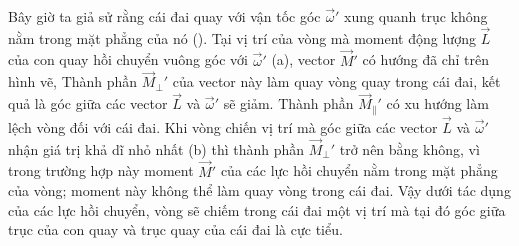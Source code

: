 Bây giờ ta giả sử rằng cái đai quay với vận tốc góc $\vec{\omega}'$ xung quanh trục không nằm trong mặt phẳng của nó (). Tại vị trí của vòng mà moment động lượng $\vec{L}$ của con quay hồi chuyển vuông góc với $\vec{\omega}'$ (a), vector $\vec{M}'$ có hướng đã chỉ trên hình vẽ, Thành phần $\vec{M}_{\perp}'$ của vector này làm quay vòng quay trong cái đai, kết quả là góc giữa các vector $\vec{L}$ và $\vec{\omega}'$ sẽ giảm. Thành phần $\vec{M}_{\parallel}'$ có xu hướng làm lệch vòng đối với cái đai. Khi vòng chiến vị trí mà góc giữa các vector $\vec{L}$ và $\vec{\omega}'$ nhận giá trị khả dĩ nhỏ nhất (b) thì thành phần $\vec{M}_{\perp}'$ trở nên bằng không, vì trong trường hợp này moment $\vec{M}'$ của các lực hồi chuyển nằm trong mặt phẳng của vòng; moment này không thể làm quay vòng trong cái đai. Vậy dưới tác dụng của các lực hồi chuyển, vòng sẽ chiếm trong cái đai một vị trí mà tại đó góc giữa trục của con quay và trục quay của cái đai là cực tiểu.

